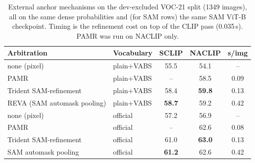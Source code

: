 \documentclass[11pt]{article}
\newcommand{\reva}{REVA}
\begin{document}
\begin{table}[t]
\centering\small
\begin{tabular}{llccc}
\toprule
Arbitration & Vocabulary & SCLIP & NACLIP & s/img \\
\midrule
none (pixel)            & plain+VABS & 55.5 & 54.1 & --   \\
PAMR                    & plain+VABS & --   & 58.5 & 0.09 \\
Trident SAM-refinement  & plain+VABS & 58.4 & \textbf{59.8} & 0.13 \\
\reva{} (SAM automask pooling) & plain+VABS & \textbf{58.7} & 59.2 & 0.42 \\
\midrule
none (pixel)            & official   & 57.2 & 56.9 & --   \\
PAMR                    & official   & --   & 62.6 & 0.08 \\
Trident SAM-refinement  & official   & 61.0 & \textbf{63.0} & 0.13 \\
SAM automask pooling    & official   & \textbf{61.2} & 62.6 & 0.42 \\
\bottomrule
\end{tabular}
\caption{External anchor mechanisms on the dev-excluded VOC-21 split (1349 images),
all on the same dense probabilities and (for SAM rows) the same SAM ViT-B checkpoint.
Timing is the refinement cost on top of the CLIP pass (0.035\,s). PAMR was run on
NACLIP only.}
\label{tab:anchor}
\end{table}
\end{document}
